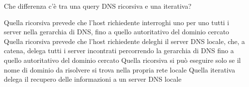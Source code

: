 \question
Che differenza c'è tra una query DNS ricorsiva e una iterativa?

\begin{checkboxes}
	\choice Quella ricorsiva prevede che l'host richiedente interroghi uno per uno tutti i server nella gerarchia di DNS, fino a quello autoritativo del dominio cercato
	\CorrectChoice Quella ricorsiva prevede che l'host richiedente deleghi il server DNS locale, che, a catena, delega tutti i server incontrati percorrendo la gerarchia di DNS fino a quello autoritativo del dominio cercato
	\choice Quella ricorsiva si può eseguire solo se il nome di dominio da risolvere si trova nella propria rete locale
	\choice Quella iterativa delega il recupero delle informazioni a un server DNS locale
\end{checkboxes}
